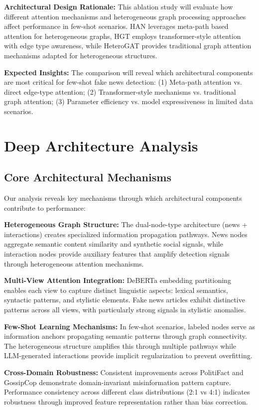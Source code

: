 \textbf{Architectural Design Rationale:} This ablation study will evaluate how different attention mechanisms and heterogeneous graph processing approaches affect performance in few-shot scenarios. HAN leverages meta-path based attention for heterogeneous graphs, HGT employs transformer-style attention with edge type awareness, while HeteroGAT provides traditional graph attention mechanisms adapted for heterogeneous structures.

\textbf{Expected Insights:} The comparison will reveal which architectural components are most critical for few-shot fake news detection: (1) Meta-path attention vs. direct edge-type attention; (2) Transformer-style mechanisms vs. traditional graph attention; (3) Parameter efficiency vs. model expressiveness in limited data scenarios.

\section{Deep Architecture Analysis}

\subsection{Core Architectural Mechanisms}

Our analysis reveals key mechanisms through which architectural components contribute to performance:

\textbf{Heterogeneous Graph Structure:} The dual-node-type architecture (news + interactions) creates specialized information propagation pathways. News nodes aggregate semantic content similarity and synthetic social signals, while interaction nodes provide auxiliary features that amplify detection signals through heterogeneous attention mechanisms.

\textbf{Multi-View Attention Integration:} DeBERTa embedding partitioning enables each view to capture distinct linguistic aspects: lexical semantics, syntactic patterns, and stylistic elements. Fake news articles exhibit distinctive patterns across all views, with particularly strong signals in stylistic anomalies.

\textbf{Few-Shot Learning Mechanisms:} In few-shot scenarios, labeled nodes serve as information anchors propagating semantic patterns through graph connectivity. The heterogeneous structure amplifies this through multiple pathways while LLM-generated interactions provide implicit regularization to prevent overfitting.

\textbf{Cross-Domain Robustness:} Consistent improvements across PolitiFact and GossipCop demonstrate domain-invariant misinformation pattern capture. Performance consistency across different class distributions (2:1 vs 4:1) indicates robustness through improved feature representation rather than bias correction.

\EndChapter
